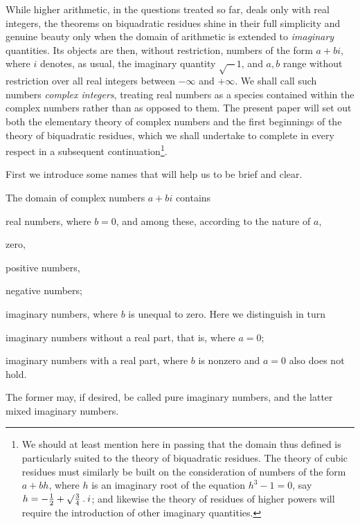 While higher arithmetic, in the questions treated so far, deals only with real integers, the theorems on biquadratic residues shine in their full simplicity and genuine beauty only when the domain of arithmetic is extended to \emph{imaginary} quantities. Its objects are then, without restriction, numbers of the form $a+bi$, where $i$ denotes, as usual, the imaginary quantity $\surd-1$, and $a,b$ range without restriction over all real integers between $-\infty$ and $+\infty$. We shall call such numbers \emph{complex integers}, treating real numbers as a species contained within the complex numbers rather than as opposed to them. The present paper will set out both the elementary theory of complex numbers and the first beginnings of the theory of biquadratic residues, which we shall undertake to complete in every respect in a subsequent continuation\begingroup\renewcommand{\thefootnote}{*)}\footnote{We should at least mention here in passing that the domain thus defined is particularly suited to the theory of biquadratic residues. The theory of cubic residues must similarly be built on the consideration of numbers of the form $a+bh$, where $h$ is an imaginary root of the equation $h^3-1=0$, say $h=-\frac12+\surd\frac34\mathbin{.} i$; and likewise the theory of residues of higher powers will require the introduction of other imaginary quantities.}\endgroup.

\clearpage
{}
First we introduce some names that will help us to be brief and clear.

The domain of complex numbers $a+bi$ contains
\begin{list}{}{\setlength{\leftmargin}{1.6em}\setlength{\labelwidth}{1.4em}\setlength{\labelsep}{.2em}}
\item[I.] real numbers, where $b=0$, and among these, according to the nature of $a$,
\begin{list}{}{\setlength{\leftmargin}{1.7em}\setlength{\labelwidth}{1.5em}\setlength{\labelsep}{.2em}}
\item[1)] zero,
\item[2)] positive numbers,
\item[3)] negative numbers;
\end{list}
\item[II.] imaginary numbers, where $b$ is unequal to zero. Here we distinguish in turn
\begin{list}{}{\setlength{\leftmargin}{1.7em}\setlength{\labelwidth}{1.5em}\setlength{\labelsep}{.2em}}
\item[1)] imaginary numbers without a real part, that is, where $a=0$;
\item[2)] imaginary numbers with a real part, where $b$ is nonzero and $a=0$ also does not hold.
\end{list}
\end{list}
The former may, if desired, be called pure imaginary numbers, and the latter mixed imaginary numbers.

